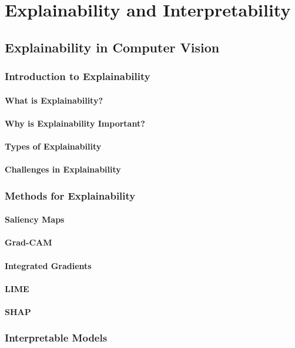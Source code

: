 \part{Explainability and Interpretability}
\chapter{Explainability in Computer Vision}
\section{Introduction to Explainability}
\subsection{What is Explainability?}
\subsection{Why is Explainability Important?}
\subsection{Types of Explainability}
\subsection{Challenges in Explainability}
\section{Methods for Explainability}
\subsection{Saliency Maps}
\subsection{Grad-CAM}
\subsection{Integrated Gradients}
\subsection{LIME}
\subsection{SHAP}
\section{Interpretable Models}
